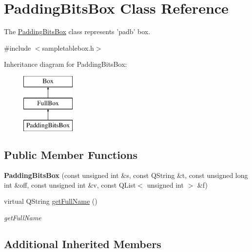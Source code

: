 \hypertarget{class_padding_bits_box}{\section{Padding\-Bits\-Box Class Reference}
\label{class_padding_bits_box}
}


The \hyperlink{class_padding_bits_box}{Padding\-Bits\-Box} class represents 'padb' box.  




{\ttfamily \#include $<$sampletablebox.\-h$>$}

Inheritance diagram for Padding\-Bits\-Box\-:\begin{figure}[H]
\begin{center}
\leavevmode
\includegraphics[height=3.000000cm]{class_padding_bits_box}
\end{center}
\end{figure}
\subsection*{Public Member Functions}
\begin{DoxyCompactItemize}
\item 
\hypertarget{class_padding_bits_box_a50f57ca1cc2179311092f7a9add74662}{{\bfseries Padding\-Bits\-Box} (const unsigned int \&s, const Q\-String \&t, const unsigned long int \&off, const unsigned int \&v, const Q\-List$<$ unsigned int $>$ \&f)}\label{class_padding_bits_box_a50f57ca1cc2179311092f7a9add74662}

\item 
virtual Q\-String \hyperlink{class_padding_bits_box_ab355f0ebfa4a84ef4a2737bc9c264004}{get\-Full\-Name} ()
\begin{DoxyCompactList}\small\item\em get\-Full\-Name \end{DoxyCompactList}\end{DoxyCompactItemize}
\subsection*{Additional Inherited Members}


